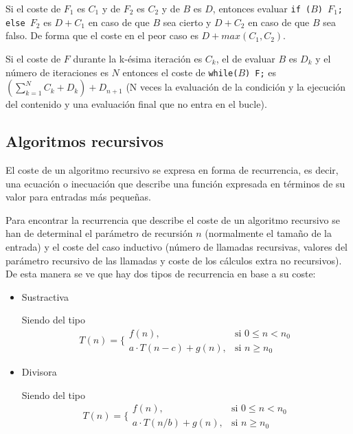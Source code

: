 Si el coste de $F_1$ es $C_1$ y de $F_2$ es $C_2$ y de $B$ es $D$, entonces
evaluar \texttt{if ($B$) $F_1$; else $F_2$} es $D + C_1$ en caso de que $B$ sea
cierto y $D + C_2$ en caso de que $B$ sea falso. De forma que el coste en el
peor caso es $D + max(C_1, C_2)$.

Si el coste de $F$ durante la k-ésima iteración es $C_k$, el de evaluar $B$ es
$D_k$ y el número de iteraciones es $N$ entonces el coste de \texttt{while($B$)
F;} es $(\sum_{k=1}^{N} C_k + D_k) + D_{n + 1}$ (N veces la evaluación de la
condición y la ejecución del contenido y una evaluación final que no entra en
el bucle).

\subsection{Algoritmos recursivos}

El coste de un algoritmo recursivo se expresa en forma de recurrencia, es
decir, una ecuación o inecuación que describe una función expresada en términos
de su valor para entradas más pequeñas.

Para encontrar la recurrencia que describe el coste de un algoritmo recursivo
se han de determinal el parámetro de recursión $n$ (normalmente el tamaño de la
entrada) y el coste del caso inductivo (número de llamadas recursivas, valores
del parámetro recursivo de las llamadas y coste de los cálculos extra no
recursivos). De esta manera se ve que hay dos tipos de recurrencia en base a su
coste:

\begin{itemize}
    \item Sustractiva

        Siendo del tipo
        \begin{equation*}
            T(n) =
            \Biggl\{
                \begin{array}{lr}
                    f(n), & \text{si } 0 \leq n < n_0 \\
                    a \cdot T(n - c) + g(n), & \text{si } n \geq n_0
                \end{array}
        \end{equation*}

    \item Divisora

        Siendo del tipo
        \begin{equation*}
            T(n) =
            \Biggl\{
                \begin{array}{lr}
                    f(n), & \text{si } 0 \leq n < n_0 \\
                    a \cdot T(n/b) + g(n), & \text{si } n \geq n_0
                \end{array}
        \end{equation*}
\end{itemize}

